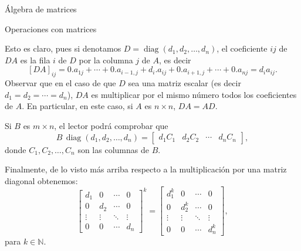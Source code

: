 \begin{chapter}{\'Algebra de matrices}
\begin{section}{Operaciones con matrices}
\begin{observacion}
\begin{equation*}
                \end{equation*}
                Esto es claro, pues si denotamos $D = \operatorname{diag}(d_1,d_2,\ldots,d_n)$, el coeficiente $ij$  de $DA$ es la fila $i$ de $D$ por la columna $j$ de $A$, es decir
                $$
                [DA]_{ij} = 0.a_{1j}+\cdots + 0.a_{i-1,j}+d_i.a_{ij}+0.a_{i+1,j}+\cdots + 0.a_{nj} = d_ia_{ij}. 
                $$
                Observar que en el caso de que $D$ sea una matriz escalar (es decir $d_1=d_2=\cdots=d_n$), $DA$ es multiplicar por el mismo número todos los coeficientes de $A$. En particular, en este caso, si $A$  es $n \times n$,  $DA = AD$.
                 
                
                
                 Si $B$ es $m \times n$, el lector podrá comprobar que 
                 \begin{equation*}
                     B\,\operatorname{diag}(d_1,d_2,\ldots,d_n) = \begin{bmatrix}
                         d_1C_1& d_2C_2& \cdots &d_nC_n
                     \end{bmatrix},
                 \end{equation*} 
                 donde $C_1,C_2,\ldots,C_n$ son las columnas de $B$.
                 
                 Finalmente,  de lo visto más arriba respecto a la multiplicación por una matriz diagonal obtenemos:
                 \begin{equation*}
                    \begin{bmatrix}
                        d_1 & 0 & \cdots &0 \\
                        0 & d_2 & \cdots &0 \\
                        \vdots & \vdots & \ddots &\vdots \\
                        0 & 0 & \cdots & d_n 
                        \end{bmatrix}^k =
                        \begin{bmatrix}
                            d_1^k & 0 & \cdots &0 \\
                            0 & d_2^k & \cdots &0 \\
                            \vdots & \vdots & \ddots &\vdots \\
                            0 & 0 & \cdots & d_n^k 
                            \end{bmatrix} ,
                 \end{equation*}
                 para $k \in \mathbb N$.
                

\end{observacion}
\end{section}
\end{chapter}
